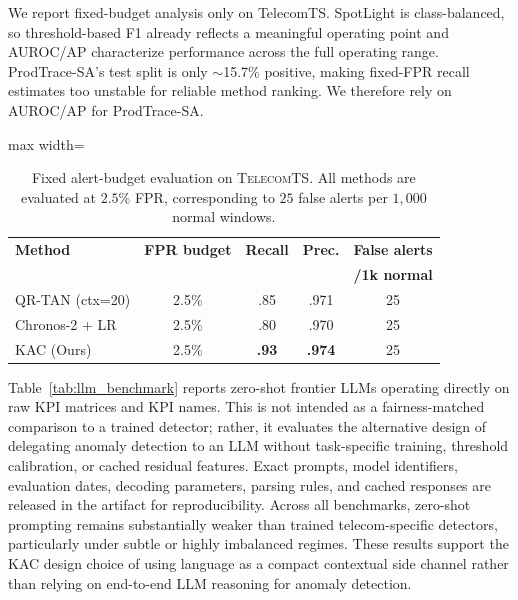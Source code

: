 \documentclass[conference]{IEEEtran}
\begin{document}
We report fixed-budget analysis only on TelecomTS. SpotLight is class-balanced, so threshold-based F1 already reflects a meaningful operating point and AUROC/AP characterize performance across the full operating range. ProdTrace-SA's test split is only $\sim$15.7\% positive, making fixed-FPR recall estimates too unstable for reliable method ranking. We therefore rely on AUROC/AP for ProdTrace-SA.

\begin{table}[t]
  \centering
  \caption{Fixed alert-budget evaluation on \textsc{TelecomTS}. All methods are evaluated at $2.5\%$ FPR, corresponding to $25$ false alerts per $1{,}000$ normal windows.}
  \label{tab:alert_budget}
  \footnotesize
  \setlength{\tabcolsep}{4.5pt}
  \begin{adjustbox}{max width=\columnwidth}
  \begin{tabular}{@{}lcccc@{}}
    \toprule
    \textbf{Method} & \textbf{FPR budget} & \textbf{Recall} & \textbf{Prec.} & \textbf{False alerts} \\
                    &                     &                 &                & \textbf{/1k normal} \\
    \midrule
    QR-TAN (ctx=20)      & 2.5\% & .85 & .971 & 25 \\
    Chronos-2 + LR       & 2.5\% & .80 & .970 & 25 \\
    KAC (Ours)           & 2.5\% & \textbf{.93} & \textbf{.974} & 25 \\
    \bottomrule
  \end{tabular}
  \end{adjustbox}
\end{table}

Table~\ref{tab:llm_benchmark} reports zero-shot frontier LLMs operating directly on raw KPI matrices and KPI names. This is not intended as a fairness-matched comparison to a trained detector; rather, it evaluates the alternative design of delegating anomaly detection to an LLM without task-specific training, threshold calibration, or cached residual features. Exact prompts, model identifiers, evaluation dates, decoding parameters, parsing rules, and cached responses are released in the artifact for reproducibility. Across all benchmarks, zero-shot prompting remains substantially weaker than trained telecom-specific detectors, particularly under subtle or highly imbalanced regimes. These results support the KAC design choice of using language as a compact contextual side channel rather than relying on end-to-end LLM reasoning for anomaly detection.
\end{document}
